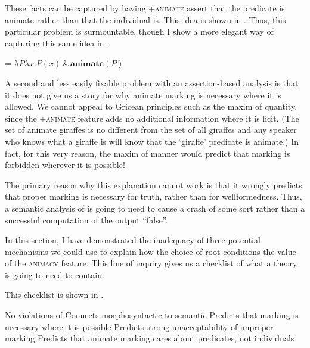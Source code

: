\documentclass[output=paper,newtxmath,modfonts,nonflat,hidelinks]{langsci/langscibook}
\begin{document}
These facts can be captured by having +\textsc{animate} assert that the predicate is animate rather than that the individual is.  This idea is shown in .  Thus, this particular problem is surmountable, though I show a more elegant way of capturing this same idea in . 

\ea\label{ex:pesetsky:assertanimatepredicates}  = $\lambda P \lambda x . P(x) \, \& \, \textbf{animate}(P) $ \\ \z

A second and less easily fixable problem with an assertion-based analysis is that it does not give us a story for why animate marking is necessary where it is allowed.  We cannot appeal to Gricean principles such as the maxim of quantity, since the +\textsc{animate} feature adds no additional information where it is licit.  (The set of animate giraffes is no different from the set of all giraffes and any speaker who knows what a giraffe is will know that the ‘giraffe’ predicate is animate.)  In fact, for this very reason, the maxim of manner would predict that  marking is forbidden wherever it is possible!

The primary reason why this explanation cannot work is that it wrongly predicts that proper  marking is necessary for truth, rather than for wellformedness. Thus, a semantic analysis of  is going to need to cause a crash of some sort rather than a successful computation of the output ``false''.

In this section, I have demonstrated the inadequacy of three potential mechanisms we could use to explain how the choice of root conditions the value of the \textsc{animacy} feature.  This line of inquiry gives us a checklist of what a theory is going to need to contain.  

This checklist is shown in .

\ea\label{ex:pesetsky:checklist} \ea No violations of  \label{ex:pesetsky:checklista}
\ex\label{ex:pesetsky:checklistb} Connects morphosyntactic  to semantic  
\ex\label{ex:pesetsky:checklistc} Predicts that  marking is necessary where it is possible 
\ex\label{ex:pesetsky:checklistd} Predicts strong unacceptability of improper  marking 
\ex\label{ex:pesetsky:checkliste} Predicts that animate marking cares about predicates, not individuals \\ \z \z
\end{document}
